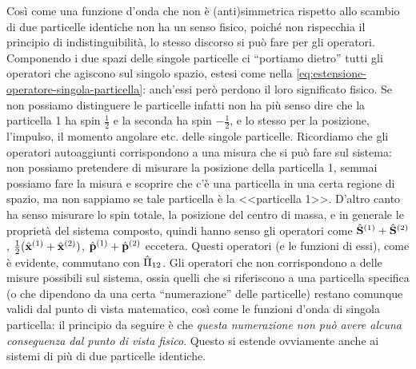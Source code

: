\begin{osservazione} \label{o:osservabili-scambio-particelle}
    Cos\`i come una funzione d'onda che non è (anti)simmetrica rispetto allo scambio di due particelle identiche non ha un senso fisico, poich\'e non rispecchia il principio di indistinguibilità, lo stesso discorso si può fare per gli operatori.
    Componendo i due spazi delle singole particelle ci ``portiamo dietro'' tutti gli operatori che agiscono sul singolo spazio, estesi come nella \eqref{eq:estensione-operatore-singola-particella}: anch'essi però perdono il loro significato fisico.
    Se non possiamo distinguere le particelle infatti non ha più senso dire che la particella 1 ha spin $\frac12$ e la seconda ha spin $-\frac12$, e lo stesso per la posizione, l'impulso, il momento angolare etc. delle singole particelle.
    Ricordiamo che gli operatori autoaggiunti corrispondono a una misura che si può fare sul sistema: non possiamo pretendere di misurare la posizione della particella 1, semmai possiamo fare la misura e scoprire che c'è una particella in una certa regione di spazio, ma non sappiamo se tale particella è la <<particella 1>>.
    D'altro canto ha senso misurare lo spin totale, la posizione del centro di massa, e in generale le proprietà del sistema composto, quindi hanno senso gli operatori come $\hat{\mathbf{S}}^{(1)}+\hat{\mathbf{S}}^{(2)}$, $\frac12(\hat{\mathbf{x}}^{(1)}+\hat{\mathbf{x}}^{(2)})$, $\hat{\mathbf{p}}^{(1)}+\hat{\mathbf{p}}^{(2)}$ eccetera.
    Questi operatori (e le funzioni di essi), come è evidente, commutano con $\hat{\Pi}_{12}$.
    Gli operatori che non corrispondono a delle misure possibili sul sistema, ossia quelli che si riferiscono a una particella specifica (o che dipendono da una certa ``numerazione'' delle particelle) restano comunque validi dal punto di vista matematico, cos\`i come le funzioni d'onda di singola particella: il principio da seguire è che \emph{questa numerazione non può avere alcuna conseguenza dal punto di vista fisico}.
    Questo si estende ovviamente anche ai sistemi di più di due particelle identiche.
\end{osservazione}

